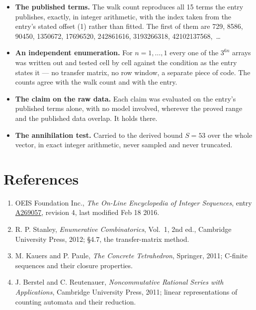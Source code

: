 \documentclass[11pt]{article}
\theoremstyle{definition}
\begin{document}
\begin{itemize}

\item {\bfseries The published terms.} The walk count reproduces all 15 terms the entry publishes, exactly, in integer arithmetic, with the index taken from the entry's stated offset (1) rather than fitted. The first of them are 729, 8586, 90450, 1350672, 17696520, 242861616, 3193266318, 42102137568,~\dots

\item {\bfseries An independent enumeration.} For $n = 1,\dots,1$ every one of the $3^{6n}$ arrays was written out and tested cell by cell against the condition as the entry states it --- no transfer matrix, no row window, a separate piece of code. The counts agree with the walk count and with the entry.

\item {\bfseries The claim on the raw data.} Each claim was evaluated on the entry's published terms alone, with no model involved, wherever the proved range and the published data overlap. It holds there.

\item {\bfseries The annihilation test.} Carried to the derived bound $S = 53$ over the whole vector, in exact integer arithmetic, never sampled and never truncated.

\end{itemize}

\section{References}

\begin{enumerate}

\item OEIS Foundation Inc., \emph{The On-Line Encyclopedia of Integer Sequences}, entry \href{https://oeis.org/A269057}{A269057}, revision 4, last modified Feb 18 2016.

\item R. P. Stanley, \emph{Enumerative Combinatorics}, Vol.~1, 2nd ed., Cambridge University Press, 2012; \S4.7, the transfer-matrix method.

\item M. Kauers and P. Paule, \emph{The Concrete Tetrahedron}, Springer, 2011; C-finite sequences and their closure properties.

\item J. Berstel and C. Reutenauer, \emph{Noncommutative Rational Series with Applications}, Cambridge University Press, 2011; linear representations of counting automata and their reduction.

\end{enumerate}
\end{document}
